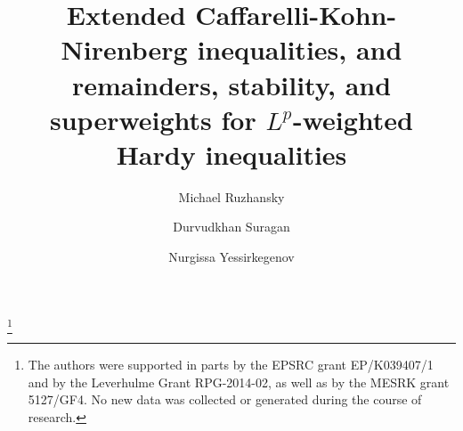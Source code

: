 \documentclass[a4paper,12pt,reqno]{amsart}
\numberwithin{equation}{section}
\theoremstyle{plain}
\theoremstyle{definition}
\begin{document}
   \title[CKN, remainders and superweights for $L^{p}$-weighted Hardy inequalities]
   {Extended Caffarelli-Kohn-Nirenberg inequalities, and remainders, stability, and superweights for $L^{p}$-weighted Hardy inequalities}


\author[M. Ruzhansky]{Michael Ruzhansky}
\address{
  Michael Ruzhansky:
  \endgraf
  Department of Mathematics
  \endgraf
  Imperial College London
   Queen's Gate, London SW7 2AZ
  \endgraf
  United Kingdom
  \endgraf
  {\it E-mail address} {\rm m.ruzhansky@imperial.ac.uk}
  }
\author[D. Suragan]{Durvudkhan Suragan}
\address{
  Durvudkhan Suragan:
  \endgraf
  Institute of Mathematics and Mathematical Modelling
   Pushkin str.
   Almaty
  \endgraf
  Kazakhstan
  \endgraf
  {\it E-mail address} {\rm suragan@math.kz}
  }
\author[N. Yessirkegenov]{Nurgissa Yessirkegenov}
\address{
  Nurgissa Yessirkegenov:
  \endgraf
  Institute of Mathematics and Mathematical Modelling
   Pushkin str.
   Almaty
  \endgraf
  Kazakhstan
  \endgraf
  and
  \endgraf
  Department of Mathematics
  \endgraf
  Imperial College London
   Queen's Gate, London SW7 2AZ
  \endgraf
  United Kingdom
  \endgraf
  {\it E-mail address} {\rm n.yessirkegenov15@imperial.ac.uk}
  }

\thanks{The authors were supported in parts by the EPSRC
 grant EP/K039407/1 and by the Leverhulme Grant RPG-2014-02,
 as well as by the MESRK grant 5127/GF4. No new data was collected or
generated during the course of research.}

\end{document}
